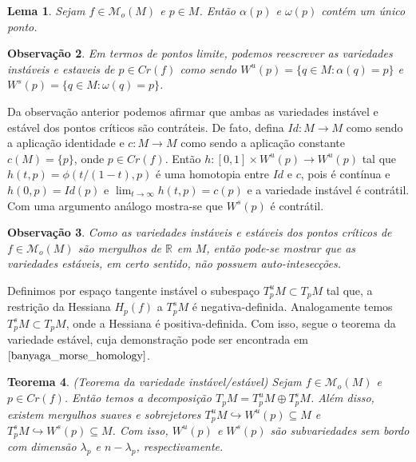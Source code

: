 \documentclass[12pt]{book}
\newtheorem{teorema}{Teorema}[section]
\newtheorem{lema}[teorema]{Lema}
\newtheorem{observacao}[teorema]{Observação}
\newcommand{\espacotangentevariedadeestavel}{T^{s}_{p}M}
\newcommand{\espacotangentevariedadeinstavel}{T^{u}_{p}M}
\newcommand{\espacotangenteponto}[2]{T_{#1}#2}
\newcommand{\espacotangentevariedade}{\espacotangenteponto{p}{M}}
\newcommand{\funcoesmorse}[1]{\mathcal{M}_{o}(#1)}
\newcommand{\hessiana}{H_{p}(f)}
\newcommand{\intervalo}{[0,1]}
\newcommand{\pontoscriticos}[1]{\textit{Cr}(#1)}
\newcommand{\real}[1]{\mathbb{R}^{#1}}
\newcommand{\reta}{\real{}}
\newcommand{\variedadeestavel}[1]{W^{s}(#1)}
\newcommand{\variedadeinstavel}[1]{W^{u}(#1)}
\begin{document}
	\begin{lema}
		Sejam $f\in \funcoesmorse{M}$ e $p \in M$. Então $\alpha(p) $ e $\omega(p)$ contém um único ponto.
	\end{lema}
	
	\begin{observacao}
		Em termos de pontos limite, podemos reescrever as variedades instáveis e estaveis de $p \in \pontoscriticos{f}$ como sendo $\variedadeinstavel{p} = \{q\in M: \alpha(q)=p\}$ e $\variedadeestavel{p} = \{q\in M: \omega(q)=p\}$.
	\end{observacao}
	
	Da observação anterior podemos afirmar que ambas as variedades instável e estável dos pontos críticos são contráteis. De fato, defina $Id: M\to M$ como sendo a aplicação identidade e $c:M\to M$ como sendo a aplicação constante $c(M) =\{p\} $, onde $p \in \pontoscriticos{f}$. Então $h:\intervalo\times \variedadeinstavel{p} \to \variedadeinstavel{p}$ tal que $h(t,p) = \phi(t/(1-t), p)$ é uma homotopia entre $Id$ e $c$, pois é contínua e $h(0, p) = Id(p)$ e $\lim_{t \to \infty}h(t, p) = c(p)$ e a variedade instável é contrátil. Com uma argumento análogo mostra-se que $\variedadeestavel{p}$ é contrátil.
	
	\begin{observacao}
		Como as variedades instáveis e estáveis dos pontos críticos de $f \in \funcoesmorse{M}$ são mergulhos de $\reta$ em $M$, então pode-se mostrar que as variedades estáveis, em certo sentido, não possuem auto-intesecções.
	\end{observacao}
	
	Definimos por espaço tangente instável o subespaço $\espacotangentevariedadeinstavel\subset \espacotangentevariedade$ tal que, a restrição da Hessiana $\hessiana$ a $\espacotangentevariedadeestavel$ é negativa-definida. Analogamente temos $\espacotangentevariedadeestavel \subset \espacotangentevariedade$, onde a Hessiana é positiva-definida. Com isso, segue o teorema da variedade estável, cuja demonstração pode ser encontrada em $\cite{banyaga_morse_homology}$.
	
	\begin{teorema}\label{teorema_variedade_instavel_estavel}
		(Teorema da variedade instável/estável) Sejam $f \in \funcoesmorse{M}$ e $p \in \pontoscriticos{f}$. Então temos a decomposição $\espacotangentevariedade=\espacotangentevariedadeinstavel\oplus\espacotangentevariedadeestavel$. Além disso, existem mergulhos suaves e sobrejetores $\espacotangentevariedadeinstavel \hookrightarrow \variedadeinstavel{p} \subseteq M$ e $\espacotangentevariedadeestavel \hookrightarrow \variedadeestavel{p} \subseteq M$. Com isso, $\variedadeinstavel{p}$ e $\variedadeestavel{p}$ são subvariedades sem bordo com dimensão $\lambda_{p}$ e $n-\lambda_{p}$, respectivamente.
	\end{teorema}
	
\end{document}
